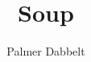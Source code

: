 \documentclass{article}
\author{Palmer Dabbelt}
\title{Soup}
\begin{document}
\maketitle
\tableofcontents
\contentsskip



\end{document}
